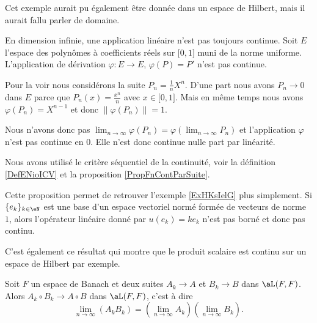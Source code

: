 Cet exemple aurait pu également être donnée dans un espace de Hilbert, mais il aurait fallu parler de domaine.


\begin{example}      \label{EXooDMVJooAJywMU}
    En dimension infinie, une application linéaire n'est pas toujours continue. Soit \( E\) l'espace des polynômes à coefficients réels sur \( \mathopen[ 0 , 1 \mathclose]\) muni de la norme uniforme. L'application de dérivation \( \varphi\colon E\to E\), \( \varphi(P)=P'\) n'est pas continue.

    Pour la voir nous considérons la suite \( P_n=\frac{1}{ n }X^n\). D'une part nous avons \( P_n\to 0\) dans \( E\) parce que \( P_n(x)=\frac{ x^n }{ n }\) avec \( x\in \mathopen[ 0 , 1 \mathclose]\). Mais en même temps nous avons \( \varphi(P_n)=X^{n-1}\) et donc \( \| \varphi(P_n) \|=1\).

    Nous n'avons donc pas \( \lim_{n\to \infty} \varphi(P_n)=\varphi(\lim_{n\to \infty} P_n)\) et l'application \( \varphi\) n'est pas continue en \( 0\). Elle n'est donc continue nulle part par linéarité.

    Nous avons utilisé le critère séquentiel de la continuité, voir la définition \ref{DefENioICV} et la proposition \ref{PropFnContParSuite}.
\end{example}

\begin{remark}  \label{RemOAXNooSMTDuN}
Cette proposition permet de retrouver l'exemple \ref{ExHKsIelG} plus simplement. Si \( \{ e_k \}_{k\in \eN}\) est une base d'un espace vectoriel normé formée de vecteurs de norme \( 1\), alors l'opérateur linéaire donné par \( u(e_k)=ke_k\) n'est pas borné et donc pas continu.
\end{remark}

C'est également ce résultat qui montre que le produit scalaire est continu sur un espace de Hilbert par exemple.

\begin{lemma}   \label{LemWWXVSae}
Soit \( F\) un espace de Banach et deux suites \( A_k\to A\) et \( B_k\to B\) dans \( \aL(F,F)\). Alors \( A_k\circ B_k\to A\circ B\) dans \( \aL(F,F)\), c'est à dire
\begin{equation}
    \lim_{n\to \infty} (A_kB_k)=\left( \lim_{n\to \infty} A_k \right)\left( \lim_{n\to \infty} B_k \right).
\end{equation}
\end{lemma}

